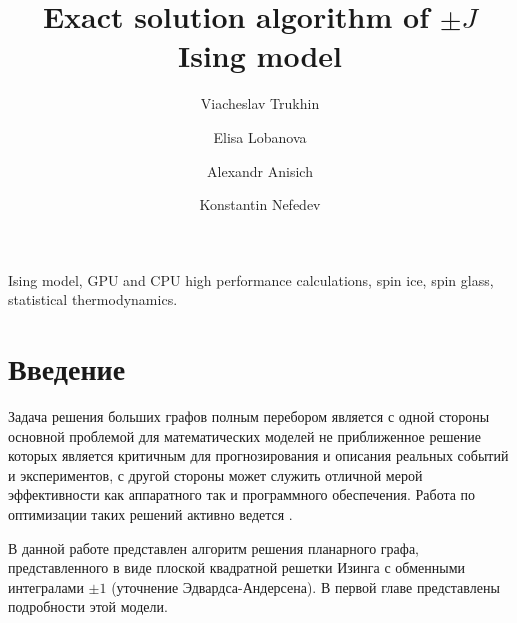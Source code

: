 \documentclass[utf8, babel, sor, jor, amsmath, amssymb, reprint]{elsarticle} %
\begin{document}
	
	\begin{frontmatter}
		
		
		\title{Exact solution algorithm of $\pm J$ Ising model}
		
		\author[mainaddress, secondaryaddress]{Viacheslav Trukhin}
		
			\author[mainaddress, secondaryaddress]{Elisa Lobanova}
		
		\author[mainaddress, secondaryaddress]{Alexandr Anisich}
		
		\author[mainaddress, secondaryaddress]{Konstantin Nefedev}
		
		\address[mainaddress]{Far Eastern Federal University, Vladivostok, Russky Island, 10 Ajax Bay, 690922, the Russian Federation}
		\address[secondaryaddress]{Institute of Applied Mathematics, Far Eastern Branch, Russian Academy of Science, Vladivostok, Radio 7, 690041, the Russian Federation}
		
		\begin{abstract}
			
			
		\end{abstract}
		
		
		\begin{keyword}
			Ising model, GPU and CPU high performance calculations, spin ice, spin glass, statistical thermodynamics.
			
		\end{keyword}
		
		
	\end{frontmatter}
	
	\linenumbers
	\newpage
	\tableofcontents
	
	\newpage
	\section*{Введение}
	
	Задача решения больших графов полным перебором является с одной стороны основной проблемой для математических моделей не приближенное решение которых является критичным для прогнозирования и описания реальных событий и экспериментов, с другой стороны может служить отличной мерой эффективности как аппаратного так и программного обеспечения. Работа по оптимизации таких решений активно ведется \cite{romero2020high}. 
	
	В данной работе представлен алгоритм решения планарного графа, представленного в виде плоской квадратной решетки Изинга с обменными интегралами $\pm 1$ (уточнение Эдвардса-Андерсена). В первой главе представлены подробности этой модели.
	
\end{document}
